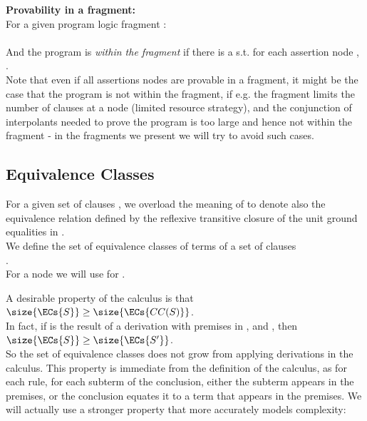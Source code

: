 \noindent
\textbf{Provability in a fragment:}\\
For a given program logic fragment :\\
\\
And the program is \emph{within the fragment} if there is a  s.t. for each assertion node , .\\
Note that even if all assertions nodes are provable in a fragment, 
it might be the case that the program is not within the fragment, 
if e.g. the fragment limits the number of clauses at a node (limited resource strategy), 
and the conjunction of interpolants needed to prove the program is too large and hence not within the fragment - in the fragments we present we will try to avoid such cases.


\subsection{Equivalence Classes}
For a given set of clauses , we overload the meaning of  to denote also the equivalence relation defined by the reflexive transitive closure of the unit ground equalities in .\\
We define the set of equivalence classes of terms of a set of clauses\\
 .\\
For a node  we will use  for .

\noindent
A desirable property of the calculus  is that\\
$\size{\ECs{S}} \geq \size{\ECs{CC(S)}}$.\\
In fact, if  is the result of a derivation with premises in , and , then $\size{\ECs{S}} \geq \size{\ECs{S'}}$. \\
So the set of equivalence classes does not grow from applying derivations in the calculus.
This property is immediate from the definition of the calculus, as for each rule, for each subterm of the conclusion, either the subterm appears in the premises, or the conclusion equates it to a term that appears in the premises.
We will actually use a stronger property that more accurately models complexity:

\noindent
